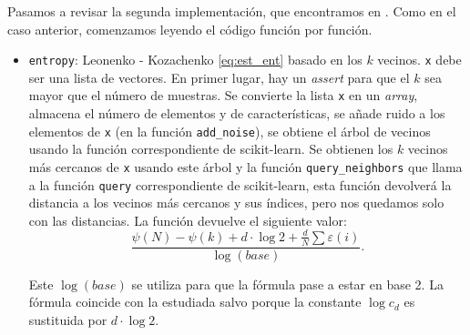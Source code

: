 \documentclass[10pt,a4paper]{article} %
\theoremstyle{definition}
\begin{document}
Pasamos a revisar la segunda implementación, que encontramos en \cite{npeet}. Como en el caso anterior, comenzamos leyendo el código función por función. 
\begin{itemize}
\item \texttt{entropy}: Leonenko - Kozachenko \ref{eq:est_ent} basado en los $k$ vecinos. \texttt{x} debe ser una lista de vectores. En primer lugar, hay un \textit{assert} para que el $k$ sea mayor que el número de muestras. Se convierte la lista \texttt{x} en un \textit{array}, almacena el número de elementos y de características, se añade ruido a los elementos de \texttt{x} (en la función \texttt{add\_noise}), se obtiene el árbol de vecinos usando la función correspondiente de scikit-learn. Se obtienen los $k$ vecinos más cercanos de \texttt{x} usando este árbol y la función \texttt{query\_neighbors} que llama a la función \texttt{query} correspondiente de scikit-learn, esta función devolverá la distancia a los vecinos más cercanos y sus índices, pero nos quedamos solo con las distancias. La función devuelve el siguiente valor:\[
  \frac{\psi(N) - \psi(k) + d \cdot \log 2 + \frac{d}{N}\sum \varepsilon(i)}{\log(base)}.
  \]

  Este $\log (base)$ se utiliza para que la fórmula pase a estar en base 2. La fórmula coincide con la estudiada salvo porque la constante $\log c_d$ es sustituida por $d \cdot \log 2$.


\end{itemize}
\end{document}
